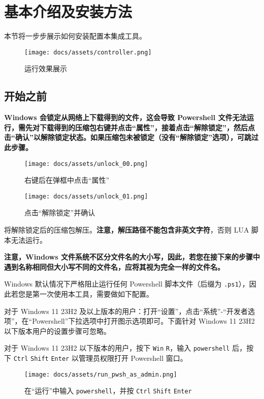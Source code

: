 \section{基本介绍及安装方法}

本节将一步步展示如何安装配置本集成工具。

\begin{figure}[H]
    \Centering
    \texttt{[image: docs/assets/controller.png]}
    \caption{运行效果展示}
\end{figure}

\subsection{开始之前}

\textbf{\color{red}Windows 会锁定从网络上下载得到的文件，这会导致 Powershell 文件无法运行，需先对下载得到的压缩包右键并点击“属性”，接着点击“解除锁定”，然后点击“确认”以解除锁定状态。如果压缩包未被锁定（没有“解除锁定”选项），可跳过此步骤。}

\begin{figure}[H]
    \Centering
    \texttt{[image: docs/assets/unlock\_00.png]}
    \caption{右键后在弹框中点击“属性”}
\end{figure}

\begin{figure}[H]
    \Centering
    \texttt{[image: docs/assets/unlock\_01.png]}
    \caption{点击“解除锁定”并确认}
\end{figure}

将解除锁定后的压缩包解压。\textbf{\color{red}注意，解压路径不能包含非英文字符}，否则 LUA 脚本无法运行。

\textbf{\color{red}注意，Windows 文件系统不区分文件名的大小写，因此，若您在接下来的步骤中遇到名称相同但大小写不同的文件名，应将其视为完全一样的文件名。}

Windows 默认情况下严格阻止运行任何 Powershell 脚本文件（后缀为 \lstinline{.ps1}），因此若您是第一次使用本工具，需要做如下配置。

对于 Windows 11 23H2 及以上版本的用户：打开“设置”，点击“系统”-“开发者选项”，在“Powershell”下拉选项中打开图示选项即可。下面针对 Windows 11 23H2 以下版本用户的设置步骤可忽略。

对于 Windows 11 23H2 以下版本的用户，按下 \lstinline{Win} \lstinline{R}，输入 \lstinline{powershell} 后，按下 \lstinline{Ctrl} \lstinline{Shift} \lstinline{Enter} 以管理员权限打开 Powershell 窗口。

\begin{figure}[H]
    \Centering
    \texttt{[image: docs/assets/run\_pwsh\_as\_admin.png]}
    \caption{在“运行”中输入 \lstinline{powershell}，并按 \lstinline{Ctrl} \lstinline{Shift} \lstinline{Enter}}
\end{figure}

